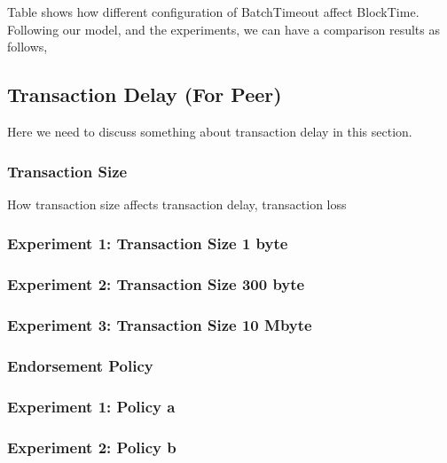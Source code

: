 \documentclass[10pt,journal,compsoc, twoside]{IEEEtran}
\begin{document}
Table shows how different configuration of BatchTimeout affect BlockTime. Following our model, and the experiments, we can have a comparison results as follows,





\subsection{Transaction Delay (For Peer)}
 
Here we need to discuss something about transaction delay in this section. 


\subsubsection{Transaction Size}

How transaction size affects transaction delay, transaction loss

\subsubsection{Experiment 1: Transaction Size 1 byte}



\subsubsection{Experiment 2: Transaction Size 300 byte}



\subsubsection{Experiment 3: Transaction Size 10 Mbyte}








\subsubsection{Endorsement Policy} 

\subsubsection{Experiment 1: Policy a}


\subsubsection{Experiment 2: Policy b}
\end{document}
